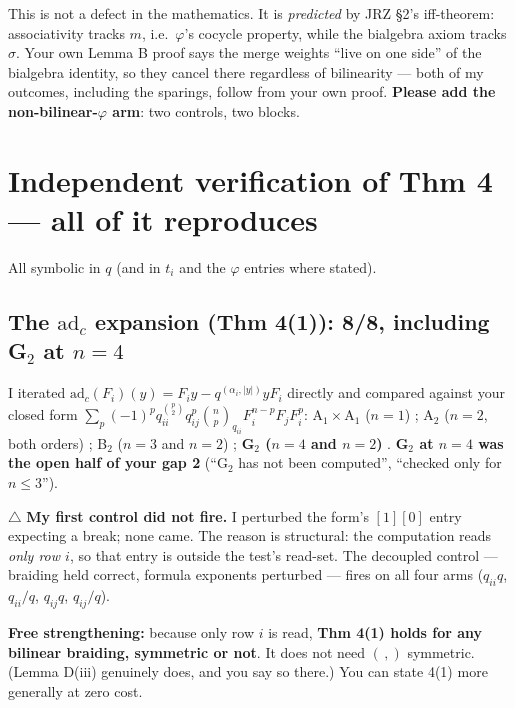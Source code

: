 \documentclass[11pt,a4paper]{article}
\newcommand{\adc}{\mathrm{ad}_c}
\begin{document}
This is not a defect in the mathematics. It is \emph{predicted} by JRZ \S2's iff-theorem:
associativity tracks $m$, i.e.\ $\varphi$'s cocycle property, while the bialgebra axiom tracks
$\sigma$. Your own Lemma B proof says the merge weights ``live on one side'' of the bialgebra
identity, so they cancel there regardless of bilinearity --- both of my outcomes, including the
sparings, follow from your own proof. \textbf{Please add the non-bilinear-$\varphi$ arm}: two
controls, two blocks.

\section{Independent verification of Thm 4 --- all of it reproduces}
All symbolic in $q$ (and in $t_i$ and the $\varphi$ entries where stated).

\subsection{The $\adc$ expansion (Thm 4(1)): 8/8, including G$_2$ at $n=4$}
I iterated $\adc(F_i)(y)=F_iy-q^{(\alpha_i,|y|)}yF_i$ directly and compared against your closed
form $\sum_p(-1)^pq_{ii}^{\binom p2}q_{ij}^p\binom np_{q_{ii}}F_i^{n-p}F_jF_i^p$:
A$_1\!\times\!$A$_1$ ($n=1$) \checkmark; A$_2$ ($n=2$, both orders) \checkmark; B$_2$ ($n=3$ and
$n=2$) \checkmark; \textbf{G$_2$ ($n=4$ and $n=2$) \checkmark}. \textbf{G$_2$ at $n=4$ was the open
half of your gap 2} (``G$_2$ has not been computed'', ``checked only for $n\le3$'').

$\triangle$ \textbf{My first control did not fire.} I perturbed the form's $[1][0]$ entry expecting
a break; none came. The reason is structural: the computation reads \emph{only row $i$}, so that
entry is outside the test's read-set. The decoupled control --- braiding held correct, formula
exponents perturbed --- fires on all four arms ($q_{ii}q$, $q_{ii}/q$, $q_{ij}q$, $q_{ij}/q$).

\textbf{Free strengthening:} because only row $i$ is read, \textbf{Thm 4(1) holds for any bilinear
braiding, symmetric or not}. It does not need $(\,,)$ symmetric. (Lemma D(iii) genuinely does, and
you say so there.) You can state 4(1) more generally at zero cost.
\end{document}
